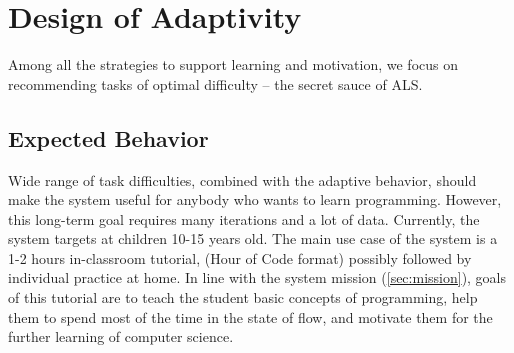 \chapter{Design of Adaptivity}
\label{chap:design-of-adaptivity}

Among all the strategies to support learning and motivation,
we focus on recommending tasks of optimal difficulty
--
the secret sauce of ALS. %


\section{Expected Behavior}  %
\label{sec:robomission.behavior}



Wide range of task difficulties, combined with the adaptive behavior,
should make the system useful for anybody who wants to learn programming.
However, this long-term goal requires many iterations and a lot of data.
Currently, the system targets at children 10-15 years old.
The main use case of the system is a 1-2 hours in-classroom tutorial,
(Hour of Code format) %
possibly followed by individual practice at home.
In line with the system mission (\cref{sec:mission}), goals of this tutorial
are to teach the student basic concepts of programming,
help them to spend most of the time in the state of flow,
and motivate them for the further learning of computer science.


